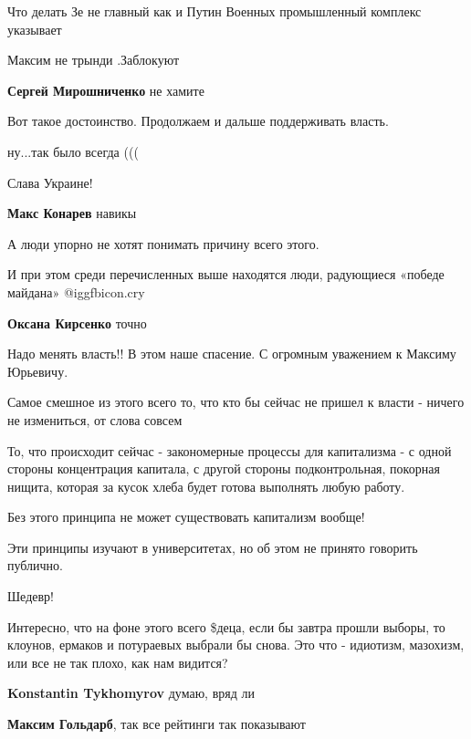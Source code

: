 \begin{itemize}
Что делать Зе не главный как и Путин Военных промышленный комплекс указывает

Максим не трынди .Заблокуют

\textbf{Сергей Мирошниченко} не хамите

Вот такое достоинство. Продолжаем и дальше поддерживать власть.

ну...так было всегда (((

Слава Украине!

\textbf{Макс Конарев} навикы

А люди упорно не хотят понимать причину всего этого.

И при этом среди перечисленных выше находятся люди, радующиеся «победе майдана»  @igg{fbicon.cry} 

\textbf{Оксана Кирсенко} точно

Надо менять власть!!
В этом наше спасение.
С огромным уважением к Максиму Юрьевичу.


Самое смешное из этого всего то, что кто бы сейчас не пришел к власти - ничего
не измениться, от слова совсем


То, что происходит сейчас - закономерные процессы для капитализма - с одной
стороны концентрация капитала, с другой стороны подконтрольная, покорная
нищита, которая за кусок хлеба будет готова выполнять любую работу.

Без этого принципа не может существовать капитализм вообще!

Эти принципы изучают в университетах, но об этом не принято говорить публично.

Шедевр!


Интересно, что на фоне этого всего \$деца, если бы завтра прошли выборы, то
клоунов, ермаков и потураевых выбрали бы снова. Это что - идиотизм, мазохизм,
или все не так плохо, как нам видится?

\begin{itemize} %
\textbf{Konstantin Tykhomyrov} думаю, вряд ли

\textbf{Максим Гольдарб}, так все рейтинги так показывают


\end{itemize}
\end{itemize}
